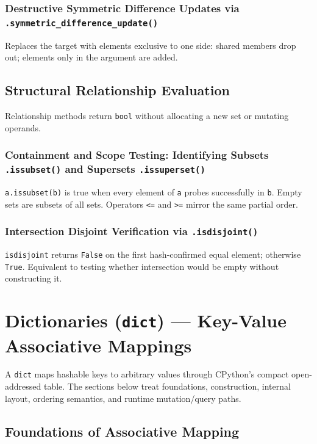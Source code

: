 \documentclass[a4paper,twoside]{report}
\begin{document}
\subsubsection{Destructive Symmetric Difference Updates via \texttt{.symmetric\_difference\_update()}}

Replaces the target with elements exclusive to one side: shared members drop out; elements only in the argument are added.


\subsection{Structural Relationship Evaluation}

Relationship methods return \texttt{bool} without allocating a new set or mutating operands.

\subsubsection{Containment and Scope Testing: Identifying Subsets \texttt{.issubset()} and Supersets \texttt{.issuperset()}}

\texttt{a.issubset(b)} is true when every element of \texttt{a} probes successfully in \texttt{b}. Empty sets are subsets of all sets. Operators \texttt{<=} and \texttt{>=} mirror the same partial order.

\subsubsection{Intersection Disjoint Verification via \texttt{.isdisjoint()}}

\texttt{isdisjoint} returns \texttt{False} on the first hash-confirmed equal element; otherwise \texttt{True}. Equivalent to testing whether intersection would be empty without constructing it.


\section{Dictionaries (\texttt{dict}) --- Key-Value Associative Mappings}

A \texttt{dict} maps hashable keys to arbitrary values through CPython's compact open-addressed table. The sections below treat foundations, construction, internal layout, ordering semantics, and runtime mutation/query paths.


\subsection{Foundations of Associative Mapping}
\end{document}
